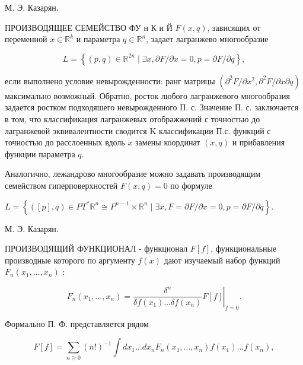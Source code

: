\documentclass[10pt]{article}
\begin{document}
М. Э. Казарян.



ПРОИЗВОДЯЩЕЕ СЕМЕЙСТВО ФУ н К и Й $F(x, q)$, зависящих от переменной $x \in \mathbb{R}^{k}$ и параметра $q \in \mathbb{R}^{n}$, задает лагранжево многообразие



\[

L=\left\{(p, q) \in \mathbb{R}^{2 n} \mid \exists x, \partial F / \partial x=0, p=\partial F / \partial q\right\},

\]



если выполнено условие невырожденности: ранг матрицы $\left(\partial^{2} F / \partial x^{2}, \partial^{2} F / \partial x \partial q\right)$ максимально возможный. Обратно, росток любого лагранжевого многообразия задается ростком подходяшего невырожденного П. с. Значение П. с. заключается в том, что классификация лагранжевых отображжений с точностью до лагранжевой эквивалентности сводится $\mathrm{K}$ классификации П.с. функций с точностью до расслоенных вдоль $x$ замены координат $(x, q)$ и прибавления функции параметра $q$.



Аналогично, лежандрово многообразие можно задавать производящим семейством гиперповерхностей $F(x, q)=0$ по формуле



$L=\left\{([p], q) \in P T^{*} \mathbb{R}^{n} \cong P^{n-1} \times \mathbb{R}^{n} \mid \exists x, F=\partial F / \partial x=0, p=\partial F / \partial q\right\}$.



М. Э. Казарян.



ПРОИЗВОДЯЩИЙ ФУНКЦИОНАЛ - функционал $F[f]$, функциональные производные которого по аргументу $f(x)$ дают изучаемый набор функций $F_{n}\left(x_{1}, \ldots, x_{n}\right)$ :



\[

F_{n}\left(x_{1}, \ldots, x_{n}\right)=\left.\frac{\delta^{n}}{\delta f\left(x_{1}\right) \ldots \delta f\left(x_{n}\right)} F[f]\right|_{f=0} .

\]



Формально П. Ф. представляется рядом



\[

F[f]=\sum_{n \geqslant 0}(n !)^{-1} \int d x_{1} \ldots d x_{n} F_{n}\left(x_{1}, \ldots, x_{n}\right) f\left(x_{1}\right) \ldots f\left(x_{n}\right),

\]
\end{document}
